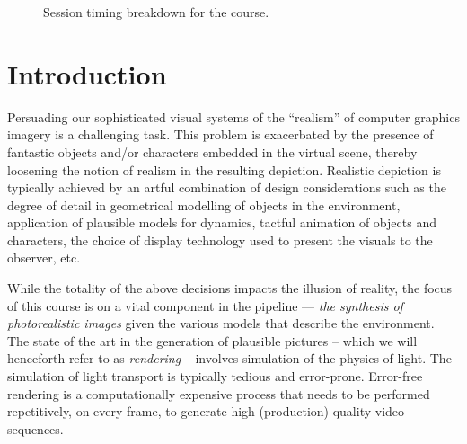 \documentclass[11pt,fleqn]{book} %
\begin{document}
\begin{figure}[b!]
\begin{center}
\end{center}
\caption{%
\label{fig:half-day}%
Session timing breakdown for the course.
}
\end{figure}






{}
\tableofcontents %

\cleardoublepage %




\chapter{Introduction}
Persuading our sophisticated visual systems of the ``realism'' of computer graphics imagery is a challenging task. 
This problem is exacerbated by the presence of fantastic objects and/or characters embedded in the virtual scene, thereby loosening the notion of realism in the resulting depiction. 
Realistic depiction is typically achieved by an artful combination of design considerations such as the degree of detail in geometrical modelling of objects in the environment, application of plausible models for dynamics, tactful animation of objects and characters, the choice of display technology used to present the visuals to the observer, etc. 

While the totality of the above decisions impacts the illusion of reality, the focus of this course is on a vital component in the pipeline --- \textit{the synthesis of photorealistic images} given the various models that describe the environment. The state of the art in the generation of plausible pictures -- which we will henceforth refer to as \textit{rendering} --  involves simulation of the physics of light. 
The simulation of light transport is typically tedious and error-prone.
Error-free rendering is a computationally expensive process that needs to be performed repetitively, on every frame, to generate high (production) quality video sequences. 
\end{document}
